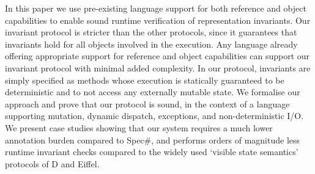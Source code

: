 In this paper we use pre-existing language support for both reference and object capabilities to enable sound runtime verification of representation invariants.
Our invariant protocol is stricter than the other  protocols, since it guarantees that invariants hold for all objects involved in the execution.
Any language already offering appropriate support for reference and object capabilities can support our invariant protocol with minimal added complexity.
In our protocol, invariants are simply specified as methods whose execution is statically guaranteed to be deterministic and to not access any externally mutable state.
We formalise our approach and prove that our protocol is sound, in the context of a language supporting mutation, dynamic dispatch, exceptions, and non-deterministic I/O.
We present case studies showing that our system requires a much lower annotation burden compared to Spec\#, and performs orders of magnitude less runtime invariant checks compared to the widely used `visible state semantics' protocols of D and Eiffel.
